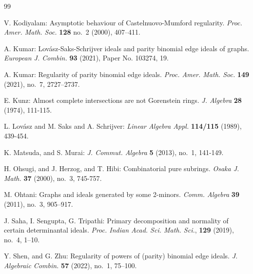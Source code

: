 \documentclass[11pt,a4paper,reqno]{amsart}
\theoremstyle{definition}
\numberwithin{equation}{section}
\begin{document}
\begin{thebibliography}{99}
{ V. Kodiyalam: \newblock Asymptotic behaviour of {C}astelnuovo-{M}umford regularity. \emph{Proc. Amer. Math. Soc.} {\bf 128} no.~2 (2000), 407–411. 


 A. Kumar: \newblock Lov\'{a}sz-{S}aks-{S}chrijver ideals and parity binomial edge ideals of graphs. \emph{European J. Combin.} {\bf 93} (2021), {Paper No. 103274, 19}.


 A. Kumar: \newblock Regularity of parity binomial edge ideals. \emph{Proc. Amer. Math. Soc.} {\bf 149} (2021), no.~7, {2727--2737}. 

 E. Kunz: \newblock Almost complete intersections are not {G}orenstein rings. \emph{J. Algebra} {\bf 28} (1974), {111-115}.

 L. Lov\'{a}sz and M. Saks and A. Schrijver:  \emph{Linear Algebra Appl.} {\bf 114/115} (1989), 439-454.




 K. Matsuda, and S. Murai:  \emph{J. Commut. Algebra} {\bf 5} (2013), no.~1, 141-149. 



 H. Ohsugi, and J. Herzog, and T. Hibi: \newblock Combinatorial pure subrings. \emph{Osaka J. Math.} {\bf 37} (2000), {no.~3}, {745-757}.

 M. Ohtani: Graphs and ideals generated by some 2-minors. \emph{Comm. Algebra} {\bf 39} (2011), no.~3, 905–917. 


 J. Saha, I. Sengupta, G. Tripathi: Primary decomposition and normality
of certain determinantal ideals. \emph{Proc. Indian Acad. Sci. Math. Sci.}, {\bf 129} (2019), no.~4, 1--10.


 Y. Shen, and G. Zhu: Regularity of powers of (parity) binomial edge ideals. \emph{J. Algebraic Combin.} {\bf 57} (2022), {no.~1},  {75--100}. 


}
\end{thebibliography}
\end{document}
